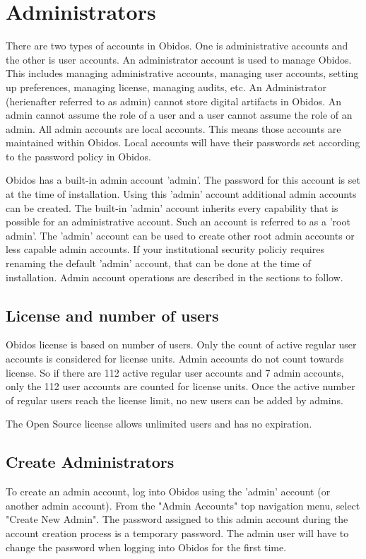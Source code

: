 \chapter{Administrators}
There are two types of accounts in Obidos. One is administrative accounts and the other is user accounts.
An administrator account is used to manage Obidos. This includes managing administrative accounts, managing user accounts, setting up preferences, managing license, managing audits, etc.
An Administrator (herienafter referred to as admin) cannot store digital artifacts in Obidos.
An admin cannot assume the role of a user and a user cannot assume the role of an admin.
All admin accounts are local accounts. This means those accounts are maintained within Obidos.
Local accounts will have their passwords set according to the password policy in Obidos.

Obidos has a built-in admin account 'admin'.
The password for this account is set at the time of installation.
Using this 'admin' account additional admin accounts can be created.
The built-in 'admin' account inherits every capability that is possible for an administrative account. 
Such an account is referred to as a 'root admin'. The 'admin' account can be used to create other root admin accounts or less capable admin accounts.
\textcolor{myblue}{If your institutional security policiy requires renaming the default 'admin' account,
that can be done at the time of installation.}
Admin account operations are described in the sections to follow.

\section{License and number of users}
Obidos license is based on number of users. Only the count of active regular user accounts is considered for license units.
Admin accounts do not count towards license. So if there are 112 active regular user accounts and 7 admin accounts, only the 
112 user accounts are counted for license units. Once the active number of regular users reach the license limit, no new users can be
added by admins.

The Open Source license allows unlimited users and has no expiration.

\section{Create Administrators}
To create an admin account, log into Obidos using the 'admin' account (or another admin account).
From the "Admin Accounts" top navigation menu, select "Create New Admin".
The password assigned to this admin account during the account creation process is a temporary password.
The admin user will have to change the password when logging into Obidos for the first time.

